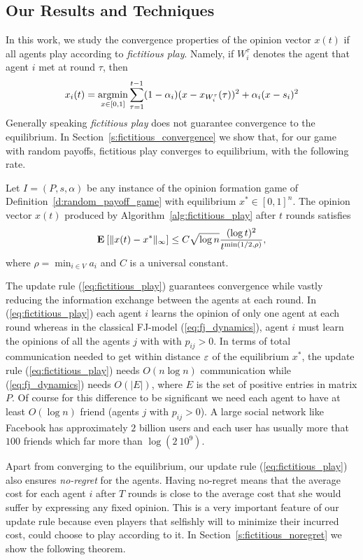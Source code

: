 \subsection{Our Results and Techniques}
In this work, we study the convergence properties
of the opinion vector $x(t)$ if all agents play according to \emph{fictitious play}.
Namely, if $W_i^\tau$ denotes the agent that agent $i$ met at round $\tau$, then
\begin{equation}\label{eq:fictitious_play}
x_i(t) =\operatorname*{argmin}_{x \in [0,1]}\sum_{\tau=1}^{t-1}(1-\alpha_i)(x-x_{W_i^\tau}(\tau))^2+\alpha_i(x-s_i)^2
\end{equation}
Generally speaking \emph{fictitious play} does not guarantee
convergence to the equilibrium. In Section~\ref{s:fictitious_convergence} 
we show that, for our game with random payoffs, fictitious play converges to equilibrium, with the following
rate.
\begin{theorem}\label{t:fictitious_convergence}
  Let $I = (P,s, \alpha)$ be any instance of the opinion formation
  game of Definition~\ref{d:random_payoff_game} with equilibrium
  $x^* \in [0,1]^n$.  The opinion vector $x(t)$ produced by
  Algorithm~\ref{alg:fictitious_play} after $t$ rounds satisfies
  \[
    \bm{\mathrm{E}}_{} \left[ \| x(t) - x^* \|_{\infty} \right] \leq
    C \sqrt{\log n}\frac{(\log t)^{2}}{t^{\min(1/2,\rho)}},
  \]
  where $\rho = \min_{i \in V} a_i$ and $C$ is a universal constant.
\end{theorem}
The update rule (\ref{eq:fictitious_play}) guarantees convergence
while vastly reducing the information exchange between the agents
at each round. In (\ref{eq:fictitious_play}) each agent $i$ learns the opinion of only one agent
at each round whereas in the classical FJ-model (\ref{eq:fj_dynamics}), agent $i$ must
learn the opinions of all the agents $j$ with with $p_{ij}>0$. In terms of
total communication needed to get within distance $\varepsilon$ of the
equilibrium $x^*$, the update rule (\ref{eq:fictitious_play}) needs
$O(n \log n)$ communication while (\ref{eq:fj_dynamics}) needs
$O(|E|)$, where $E$ is the set of positive entries in matrix $P$. 
Of course for this difference to be significant we need
each agent to have at least $O(\log n)$ friend (agents $j$ with $p_{ij}>0$). A large social
network like Facebook has approximately $2$ billion users and each user
has usually more that $100$ friends which far more than $\log(2\ 10^9)$.

Apart from converging to the equilibrium, our update rule
(\ref{eq:fictitious_play}) also ensures \emph{no-regret} for the agents.
Having no-regret means that the average cost for each agent $i$
after $T$ rounds is close to the average cost that she would
suffer by expressing any fixed opinion. This is a very important
feature of our update rule because even players that selfishly
will to minimize their incurred cost, could choose to play according
to it. In Section~\ref{s:fictitious_noregret} we show the following
theorem.


